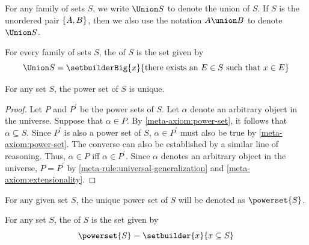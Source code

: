 \begin{notation}
    For any family of sets \( S \), we write \( \Union S \) to denote the union of \( S \). 
    If \( S \) is the unordered pair \( \mleft\{ A, B \mright\} \), then we also use the notation
    \( A \union B \) to denote \( \Union S \).
\end{notation}

\begin{dfn}[Union]
     \label{dfn:metatheory-the-union-of-sets}
    For every family of sets \( S \), the  of \( S \) is the set given by
    \begin{equation*}
        \Union S = \setbuilderBig{x}{\text{there exists an \( E \in S \) such that \( x \in E \)}}
    \end{equation*}
\end{dfn}

\begin{thm}
     \label{thm:metatheory-uniqueness-of-power-set}
    For any set \( S \), the power set of \( S \) is unique.
\end{thm}

\begin{proof}
    Let \( P \) and \( P^{\prime} \) be the power sets of \( S \).
    Let \( \alpha \) denote an arbitrary object in the universe.
    Suppose that \( \alpha \in P \). By \cref{meta-axiom:power-set}, it follows that \( \alpha \subseteq S \).
    Since \( P^{\prime} \) is also a power set of \( S \), \( \alpha \in P^{\prime} \) must also be true by
    \cref{meta-axiom:power-set}. The converse can also be established by a similar line of reasoning.
    Thus, \( \alpha \in P \) iff \( \alpha \in P^{\prime} \).
    Since \( \alpha \) denotes an arbitrary object in the universe, \( P = P^{\prime} \) by
    \cref{meta-rule:universal-generalization} and \cref{meta-axiom:extensionality}.
\end{proof}

\begin{notation}
    For any given set \( S \), the unique power set of \( S \) will be denoted as \( \powerset{S} \).
\end{notation}

\begin{dfn}
     \label{dfn:metatheory-power-set}
    For any set \( S \), the  of \( S \) is the set given by
    \begin{equation*}
        \powerset{S} = \setbuilder{x}{x \subseteq S}
    \end{equation*}
\end{dfn}

